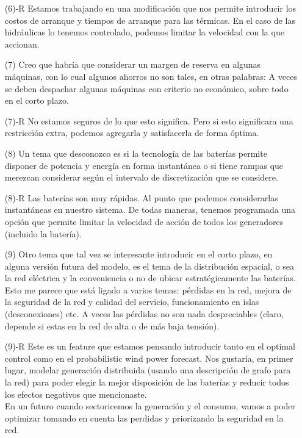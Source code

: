 \documentclass[12pt]{article}
\theoremstyle{definition}
\theoremstyle{remark}
\begin{document}
\begin{enumerate}
\item[(6)-R] Estamos trabajando en una modificaci\'on que nos permite introducir los costos de arranque y tiempos de arranque para las t\'ermicas. En el caso de las hidráulicas lo tenemos controlado, podemos limitar la velocidad con la que accionan.

\item[(7)] Creo que habr\'ia que considerar un margen de reserva en algunas máquinas, con lo cual algunos  ahorros  no son tales, en otras palabras: A veces se deben despachar algunas máquinas con criterio no econ\'omico, sobre todo en el corto plazo.

\item[(7)-R] No estamos seguros de lo que esto significa. Pero si esto significara una restricci\'on extra, podemos agregarla y satisfacerla de forma \'optima.

\item[(8)] Un tema que desconozco es si la tecnolog\'ia de las bater\'ias permite disponer de potencia y energ\'ia en forma instantánea o si tiene rampas que merezcan considerar seg\'un el intervalo de discretizaci\'on que se considere.

\item[(8)-R] Las bater\'ias son muy rápidas. Al punto que podemos considerarlas instantáneas en nuestro sistema. De todas maneras, tenemos programada una opci\'on que permite limitar la velocidad de acci\'on de todos los generadores (incluido la bater\'ia).

\item[(9)] Otro tema que tal vez se interesante introducir en el corto plazo, en alguna versi\'on futura del modelo, es el tema de la distribuci\'on espacial, o sea la red el\'ectrica y la conveniencia o no de ubicar estrat\'egicamente las bater\'ias. Esto me parece que está ligado a varios temas: p\'erdidas en la red, mejora de la seguridad de la red y calidad del servicio, funcionamiento en islas (desconexiones) etc. A veces las p\'erdidas no son nada despreciables (claro, depende si estas en la red de alta o de más baja tensi\'on).

\item[(9)-R] Este es un feature que estamos pensando introducir tanto en el optimal control como en el probabilistic wind power forecast. Nos gustar\'ia, en primer lugar, modelar generaci\'on distribuida (usando una descripci\'on de grafo para la red) para poder elegir la mejor disposici\'on de las bater\'ias y reducir todos los efectos negativos que mencionaste.\\
En un futuro cuando sectoricemos la generaci\'on y el consumo, vamos a poder optimizar tomando en cuenta las perdidas y priorizando la seguridad en la red.


\end{enumerate}
\end{document}

